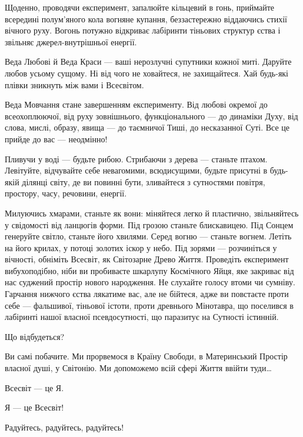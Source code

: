 Щоденно, проводячи експеримент, запалюйте кільцевий в гонь, приймайте всередині
полум’яного кола вогняне купання, беззастережно віддаючись стихії вічного руху.
Вогонь потужно відкриває лабіринти тіньових структур єства і звільняє
джерел-внутрішньої енергії.

Веда Любові й Веда Краси — ваші нерозлучні супутники кожної миті. Даруйте любов
усьому сущому. Ні від чого не ховайтеся, не захищайтеся. Хай будь-які плівки
зникнуть між вами і Всесвітом.

Веда Мовчання стане завершенням експерименту. Від любові окремої до
всеохоплюючої, від руху зовнішнього, функціонального — до динаміки Духу, від
слова, мислі, образу, явища — до таємничої Тиші, до несказанної Суті. Все це
прийде до вас — неодмінно!

Пливучи у воді — будьте рибою. Стрибаючи з дерева — станьте птахом. Левітуйте, відчувайте себе невагомими, всюдисущими, будьте присутні в будь-якій ділянці світу, де ви повинні бути, зливайтеся з сутностями повітря, простору, часу, речовини, енергії.

Милуючись хмарами, станьте як вони: міняйтеся легко й пластично, звільняйтесь у
свідомості від ланцюгів форми. Під грозою станьте блискавицею. Під Сонцем
генеруйте світло, станьте його хвилями. Серед вогню — станьте вогнем. Летіть на
його крилах, у потоці золотих іскор у небо. Під зорями — розчиніться у
вічності, обніміть Всесвіт, як Світозарне Древо Життя. Проведіть експеримент
вибухоподібно, ніби ви пробиваєте шкарлупу Космічного Яйця, яке закриває від
нас суджений простір нового народження. Не слухайте голосу втоми чи сумніву.
Гарчання нижчого єства лякатиме вас, але не бійтеся, адже ви повстаєте проти
себе — фальшивої, тіньової істоти, проти древнього Мінотавра, що поселився в
лабіринті нашої власної псевдосутності, що паразитує на Сутності істинній.

Що відбудеться?

Ви самі побачите. Ми прорвемося в Країну Свободи, в Материнський Простір
власної душі, у Світонію. Ми допоможемо всій сфері Життя ввійти туди…

Всесвіт — це Я.

Я — це Всесвіт!

Радуйтесь, радуйтесь, радуйтесь!


